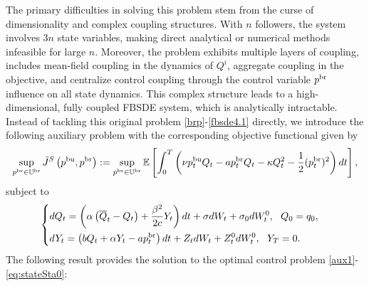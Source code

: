 \documentclass[11pt]{article}
\numberwithin{equation}{section}
\begin{document}
The primary difficulties in solving this problem stem from the curse of dimensionality and complex coupling structures. With $n$ followers, the system involves $3n$ state variables, making direct analytical or numerical methods infeasible for large $n$. Moreover, the problem exhibits multiple layers of coupling, includes mean-field coupling in the dynamics of $Q^i$, aggregate coupling in the objective, and centralize control coupling through the control variable $p^{{\rm br}}$ influence on all state dynamics. This complex structure leads to a high-dimensional, fully coupled FBSDE system, which is analytically intractable.  Instead of tackling this original problem \eqref{brp}-\eqref{fbsde4.1} directly, we introduce the following auxiliary problem with the corresponding objective functional given by
\begin{align}\label{aux1}
\sup_{p^{{\rm br}}\in\mathbb{U}^{\rm br}}\tilde{J}^S\left(p^{{\rm bu}}, p^{{\rm br}}\right):=\sup_{p^{{\rm br}}\in\mathbb{U}^{\rm br}}\mathbb{E}\left[\int_0^T\left(\nu p_t^{{\rm bu}} Q_t-ap_t^{{\rm br}}Q_t-\kappa Q_t^2-\frac{1}{2}(p_t^{{\rm br}})^2\right)dt\right],
\end{align}
subject to 
\begin{align}\label{eq:stateSta0}
\begin{cases}
    \displaystyle dQ_t=\left(\alpha\left(\overline{Q}_t-Q_t\right)+\frac{\beta^2}{2c}Y_t\right)dt+\sigma dW_t+\sigma_0dW_t^0,~~Q_0=q_0,\\[0.8em]
    \displaystyle dY_t=\left(bQ_t+\alpha Y_t- ap_t^{{\rm br}}\right)dt+Z_tdW_t+Z_t^0dW_t^0,~~Y_T=0.
\end{cases}
\end{align}
The following result provides the solution to the optimal control problem \eqref{aux1}-\eqref{eq:stateSta0}:
\end{document}

